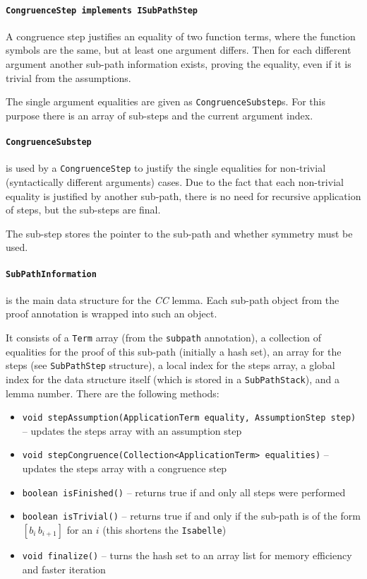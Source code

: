 \documentclass[10pt,a4paper]{article}
\newcommand{\isa}{\texttt{Isabelle}\xspace}
\newcommand{\ttt}{\texttt}
\begin{document}
\paragraph*{\ttt{CongruenceStep implements ISubPathStep}}
A congruence step justifies an equality of two function terms, where the function symbols are the same, but at least one argument differs. Then for each different argument another sub-path information exists, proving the equality, even if it is trivial from the assumptions. 

The single argument equalities are given as \ttt{CongruenceSubstep}s. For this purpose there is an array of sub-steps and the current argument index.
%
\paragraph*{\ttt{CongruenceSubstep}} is used by a \ttt{CongruenceStep} to justify the single equalities for non-trivial (syntactically different arguments) cases. Due to the fact that each non-trivial equality is justified by another sub-path, there is no need for recursive application of steps, but the sub-steps are final.

The sub-step stores the pointer to the sub-path and whether symmetry must be used.
%
\paragraph*{\ttt{SubPathInformation}} is the main data structure for the \emph{CC} lemma. Each sub-path object from the proof annotation is wrapped into such an object.

It consists of a \ttt{Term} array (from the \ttt{subpath} annotation), a collection of equalities for the proof of this sub-path (initially a hash set), an array for the steps (see \ttt{SubPathStep} structure), a local index for the steps array, a global index for the data structure itself (which is stored in a \ttt{SubPathStack}), and a lemma number. There are the following methods:
%
\begin{itemize}
	\item \ttt{void~stepAssumption(ApplicationTerm~equality, AssumptionStep~step)} \hfill -- \hfill updates the steps array with an assumption step
	\item \ttt{void~stepCongruence(Collection<ApplicationTerm>~equalities)} -- updates the steps array with a congruence step
	\item \ttt{boolean~isFinished()} -- returns true if and only all steps were performed
	\item \ttt{boolean~isTrivial()} -- returns true if and only if the sub-path is of the form $[b_i \, b_{i+1}]$ for an $i$ (this shortens the \isa)
	\item \ttt{void~finalize()} -- turns the hash set to an array list for memory efficiency and faster iteration
\end{itemize}
\end{document}
